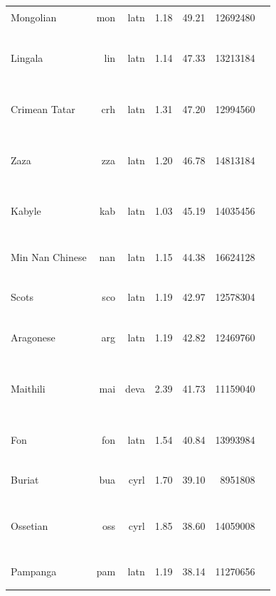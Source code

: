 \documentclass[11pt]{article}
\begin{document}
\begin{center}
\begin{longtable}[width=0.9\textwidth]{|lrrrrrl|}
Mongolian & mon & latn & 1.18 & 49.21 & 12692480 & {\color{glot500}\rule{4.0cm}{8pt}} \\ 
Lingala & lin & latn & 1.14 & 47.33 & 13213184 & {\color{nllb}\rule{1.98cm}{8pt}}{\color{madlad400}\rule{1.1cm}{8pt}}{\color{glot500}\rule{0.62cm}{8pt}}{\color{other}\rule{0.2999999999999998cm}{8pt}} \\ 
Crimean Tatar & crh & latn & 1.31 & 47.20 & 12994560 & {\color{nllb}\rule{3.44cm}{8pt}}{\color{glot500}\rule{0.29cm}{8pt}}{\color{other}\rule{0.27cm}{8pt}} \\ 
Zaza & zza & latn & 1.20 & 46.78 & 14813184 & {\color{nllb}\rule{1.34cm}{8pt}}{\color{madlad400}\rule{1.43cm}{8pt}}{\color{glot500}\rule{0.77cm}{8pt}}{\color{other}\rule{0.45999999999999996cm}{8pt}} \\ 
Kabyle & kab & latn & 1.03 & 45.19 & 14035456 & {\color{nllb}\rule{2.94cm}{8pt}}{\color{glot500}\rule{0.81cm}{8pt}}{\color{other}\rule{0.25cm}{8pt}} \\ 
Min Nan Chinese & nan & latn & 1.15 & 44.38 & 16624128 & {\color{madlad400}\rule{0.32cm}{8pt}}{\color{glot500}\rule{2.0cm}{8pt}}{\color{other}\rule{1.6800000000000002cm}{8pt}} \\ 
Scots & sco & latn & 1.19 & 42.97 & 12578304 & {\color{glot500}\rule{3.83cm}{8pt}}{\color{other}\rule{0.16999999999999993cm}{8pt}} \\ 
Aragonese & arg & latn & 1.19 & 42.82 & 12469760 & {\color{oscar}\rule{0.02cm}{8pt}}{\color{glot500}\rule{2.45cm}{8pt}}{\color{other}\rule{1.5299999999999998cm}{8pt}} \\ 
Maithili & mai & deva & 2.39 & 41.73 & 11159040 & {\color{oscar}\rule{0.0cm}{8pt}}{\color{nllb}\rule{2.68cm}{8pt}}{\color{madlad400}\rule{0.48cm}{8pt}}{\color{glot500}\rule{0.41cm}{8pt}}{\color{other}\rule{0.4299999999999997cm}{8pt}} \\ 
Fon & fon & latn & 1.54 & 40.84 & 13993984 & {\color{nllb}\rule{3.27cm}{8pt}}{\color{madlad400}\rule{0.58cm}{8pt}}{\color{glot500}\rule{0.1499999999999999cm}{8pt}} \\ 
Buriat & bua & cyrl & 1.70 & 39.10 & 8951808 & {\color{oscar}\rule{0.0cm}{8pt}}{\color{madlad400}\rule{0.34cm}{8pt}}{\color{other}\rule{3.66cm}{8pt}} \\ 
Ossetian & oss & cyrl & 1.85 & 38.60 & 14059008 & {\color{oscar}\rule{0.22cm}{8pt}}{\color{madlad400}\rule{2.88cm}{8pt}}{\color{glot500}\rule{0.61cm}{8pt}}{\color{other}\rule{0.29000000000000004cm}{8pt}} \\ 
Pampanga & pam & latn & 1.19 & 38.14 & 11270656 & {\color{oscar}\rule{0.0cm}{8pt}}{\color{glot500}\rule{3.67cm}{8pt}}{\color{other}\rule{0.33000000000000007cm}{8pt}} \\ 

\end{longtable}
\end{center}
\end{document}
